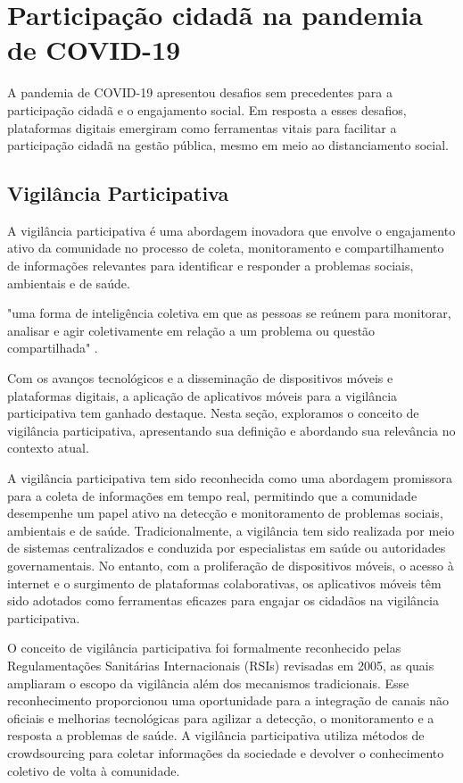 \section*{Participação cidadã na pandemia de COVID-19}
A pandemia de COVID-19 apresentou desafios sem precedentes para a participação cidadã e o engajamento social. Em resposta a esses desafios, plataformas digitais emergiram como ferramentas vitais para facilitar a participação cidadã na gestão pública, mesmo em meio ao distanciamento social.

\subsection*{Vigilância Participativa}
A vigilância participativa é uma abordagem inovadora que envolve o engajamento ativo da comunidade no processo de coleta, monitoramento e compartilhamento de informações relevantes para identificar e responder a problemas sociais, ambientais e de saúde. 

\begin{citacao}
	"uma forma de inteligência coletiva em que as pessoas se reúnem para monitorar, analisar e agir coletivamente em relação a um problema ou questão compartilhada" \cite[p. 1]{2011_Bryer}.
\end{citacao}

Com os avanços tecnológicos e a disseminação de dispositivos móveis e plataformas digitais, a aplicação de aplicativos móveis para a vigilância participativa tem ganhado destaque. Nesta seção, exploramos o conceito de vigilância participativa, apresentando sua definição e abordando sua relevância no contexto atual.

A vigilância participativa tem sido reconhecida como uma abordagem promissora para a coleta de informações em tempo real, permitindo que a comunidade desempenhe um papel ativo na detecção e monitoramento de problemas sociais, ambientais e de saúde. Tradicionalmente, a vigilância tem sido realizada por meio de sistemas centralizados e conduzida por especialistas em saúde ou autoridades governamentais. No entanto, com a proliferação de dispositivos móveis, o acesso à internet e o surgimento de plataformas colaborativas, os aplicativos móveis têm sido adotados como ferramentas eficazes para engajar os cidadãos na vigilância participativa.

O conceito de vigilância participativa foi formalmente reconhecido pelas Regulamentações Sanitárias Internacionais (RSIs) revisadas em 2005, as quais ampliaram o escopo da vigilância além dos mecanismos tradicionais. Esse reconhecimento proporcionou uma oportunidade para a integração de canais não oficiais e melhorias tecnológicas para agilizar a detecção, o monitoramento e a resposta a problemas de saúde. A vigilância participativa utiliza métodos de crowdsourcing para coletar informações da sociedade e devolver o conhecimento coletivo de volta à comunidade.\cite[1]{2017_Smolinski}

